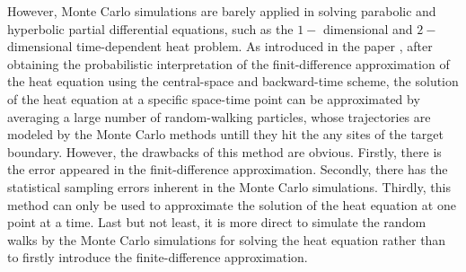 However, Monte Carlo simulations are barely applied in solving parabolic and hyperbolic partial differential equations, such as the $1-$ dimensional and $2-$ dimensional time-dependent heat problem. As introduced in the paper \cite{sadiku2006monte}, after obtaining the probabilistic interpretation of the finit-difference approximation of the heat equation using the central-space and backward-time scheme, the solution of the heat equation at a specific space-time point can be approximated by averaging a large number of random-walking particles, whose trajectories are modeled by the Monte Carlo methods untill they hit the any sites of the target boundary. However, the drawbacks of this method are obvious. Firstly, there is the error appeared in the finit-difference approximation. Secondly, there has the statistical sampling errors inherent in the Monte Carlo simulations. Thirdly, this method can only be used to approximate the solution of the heat equation at one point at a time. Last but not least, it is more direct to simulate the random walks by the Monte Carlo simulations for solving the heat equation rather than to firstly introduce the finite-difference approximation. 







